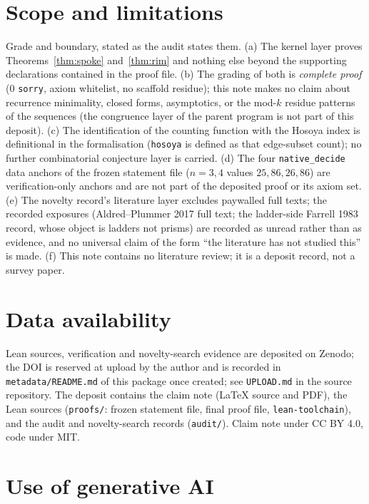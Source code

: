 \documentclass[11pt]{article}
\begin{document}
\section{Scope and limitations}\label{sec:limits}

Grade and boundary, stated as the audit states them. (a) The kernel layer
proves Theorems~\ref{thm:spoke} and~\ref{thm:rim} and nothing else beyond the
supporting declarations contained in the proof file. (b) The grading of both
is \emph{complete proof} ($0$ \texttt{sorry}, axiom whitelist, no scaffold
residue); this note makes no claim about recurrence minimality, closed forms,
asymptotics, or the mod-$k$ residue patterns of the sequences (the congruence
layer of the parent program is not part of this deposit). (c) The
identification of the counting function with the Hosoya index is definitional
in the formalisation (\texttt{hosoya} is defined as that edge-subset count);
no further combinatorial conjecture layer is carried. (d) The four
\texttt{native\_decide} data anchors of the frozen statement file
($n=3,4$ values $25, 86, 26, 86$) are verification-only anchors and are not
part of the deposited proof or its axiom set. (e) The novelty record's
literature layer excludes paywalled full texts; the recorded exposures
(Aldred--Plummer 2017 full text; the ladder-side Farrell 1983 record, whose
object is ladders not prisms) are recorded as unread rather than as evidence,
and no universal claim of the form ``the literature has not studied this'' is
made. (f) This note contains no literature review; it is a deposit record,
not a survey paper.

\section*{Data availability}

Lean sources, verification and novelty-search evidence are deposited on
Zenodo; the DOI is reserved at upload by the author and is recorded in
\texttt{metadata/README.md} of this package once created; see
\texttt{UPLOAD.md} in the source repository. The deposit contains the claim
note (LaTeX source and PDF), the Lean sources (\texttt{proofs/}: frozen
statement file, final proof file, \texttt{lean-toolchain}), and the audit and
novelty-search records (\texttt{audit/}). Claim note under CC BY 4.0, code
under MIT.

\section*{Use of generative AI}
\end{document}
